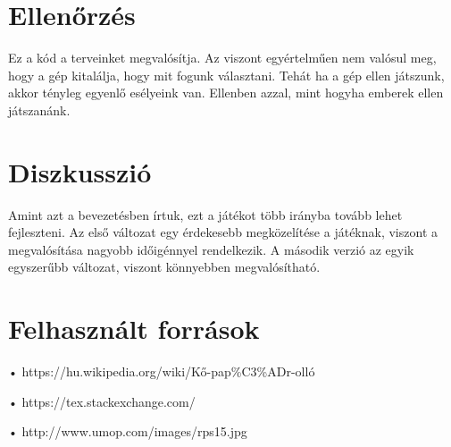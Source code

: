 \documentclass[a4paper, 12pt]{article}
\begin{document}
\section{Ellenőrzés}

Ez a kód a terveinket megvalósítja. Az viszont egyértelműen nem valósul meg, hogy a gép kitalálja, hogy mit fogunk választani. Tehát ha a gép ellen játszunk, akkor tényleg egyenlő esélyeink van. Ellenben azzal, mint hogyha emberek ellen játszanánk.

\section{Diszkusszió}

Amint azt a bevezetésben írtuk, ezt a játékot több irányba tovább lehet fejleszteni. Az első változat egy érdekesebb megközelítése a játéknak, viszont a megvalósítása nagyobb időigénnyel rendelkezik. A második verzió az egyik egyszerűbb változat, viszont könnyebben megvalósítható.

\section{Felhasznált források}
• https://hu.wikipedia.org/wiki/Kő-pap\%C3\%ADr-olló

• https://tex.stackexchange.com/

• http://www.umop.com/images/rps15.jpg
\end{document}
